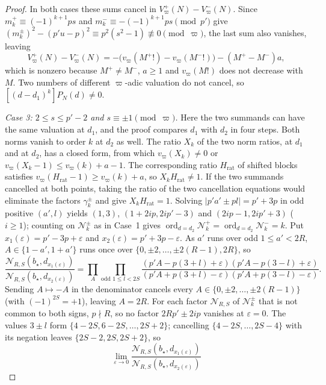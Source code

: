 \documentclass[twoside,10pt]{article}
\numberwithin{equation}{section}
\theoremstyle{slbody}
\theoremstyle{definition}
\theoremstyle{remark}
\newcommand{\ord}{\operatorname{ord}}
\begin{document}
\begin{proof}
In both cases these sums cancel in \(V_\varpi^+(N)-V_\varpi^-(N)\).  Since
\(m^+_k\equiv(-1)^{k+1}ps\) and \(m^-_k\equiv-(-1)^{k+1}ps\pmod{p'}\) give
\((m^\pm_k)^2-(p'u-p)^2\equiv p^2(s^2-1)\not\equiv0\pmod\varpi\), the last sum
also vanishes, leaving
\[
 V_\varpi^+(N)-V_\varpi^-(N)=-\bigl(v_\varpi(M^+!)-v_\varpi(M^-!)\bigr)-(M^+-M^-)a,
\]
which is nonzero because \(M^+\neq M^-\), \(a\geq1\) and \(v_\varpi(M!)\) does not
decrease with \(M\).  Two numbers of different \(\varpi\)-adic valuation do not
cancel, so \([(d-d_1)^k]P_N(d)\neq0\).

\emph{Case 3: \(2\leq s\leq p'-2\) and \(s\equiv\pm1\pmod\varpi\).}  Here the
two summands can have the same valuation at \(d_1\), and the proof compares
\(d_1\) with \(d_2\) in four steps.  Both norms vanish to order \(k\) at
\(d_2\) as well.  The ratio \(X_k\) of the two norm ratios, at \(d_1\) and at
\(d_2\), has a closed form, from which \(v_\varpi(X_k)\neq0\) or
\(v_\varpi(X_k-1)\leq v_\varpi(k)+a-1\).  The corresponding ratio
\(H_{\mathrm{rat}}\) of shifted blocks satisfies
\(v_\varpi(H_{\mathrm{rat}}-1)\geq v_\varpi(k)+a\), so
\(X_kH_{\mathrm{rat}}\neq1\).  If the two summands cancelled at both points,
taking the ratio of the two cancellation equations would eliminate the
factors \(\gamma^\pm_k\) and give \(X_kH_{\mathrm{rat}}=1\).
Solving
\(|p'a'\pm pl|=p'+3p\) in odd positive \((a',l)\) yields \((1,3)\),
\((1+2ip,2ip'-3)\) and \((2ip-1,2ip'+3)\) (\(i\geq1\)); counting on
\(\mathcal N^\pm_k\) as in Case~1 gives
\(\ord_{d=d_2}\mathcal N^+_k=\ord_{d=d_2}\mathcal N^-_k=k\).  Put
\(x_1(\varepsilon)=p'-3p+\varepsilon\) and
\(x_2(\varepsilon)=p'+3p-\varepsilon\).  As \(a'\) runs over odd
\(1\leq a'<2R\), \(A\in\{1-a',1+a'\}\) runs once over
\(\{0,\pm2,\ldots,\pm2(R-1),2R\}\), so
\[
 \frac{{\mathcal N}_{R,S}(b_\star,d_{x_1(\varepsilon)})}
      {{\mathcal N}_{R,S}(b_\star,d_{x_2(\varepsilon)})}
 =\prod_{A}\prod_{\text{odd }1\leq l<2S}
 \frac{(p'A-p(3+l)+\varepsilon)(p'A-p(3-l)+\varepsilon)}
      {(p'A+p(3+l)-\varepsilon)(p'A+p(3-l)-\varepsilon)}.
\]
Sending \(A\mapsto-A\) in the denominator cancels every
\(A\in\{0,\pm2,\ldots,\pm2(R-1)\}\) (with \((-1)^{2S}=+1\)), leaving
\(A=2R\).  For each factor \({\mathcal N}_{R,S}\) of \(\mathcal N^\pm_k\) that is not
common to both signs, \(p\nmid R\), so no factor \(2Rp'\pm2ip\) vanishes at
\(\varepsilon=0\).  The values \(3\pm l\) form \(\{4-2S,6-2S,\dots,2S+2\}\);
cancelling \(\{4-2S,\dots,2S-4\}\) with its negation leaves
\(\{2S-2,2S,2S+2\}\), so
\[
 \lim_{\varepsilon\to0}
 \frac{{\mathcal N}_{R,S}(b_\star,d_{x_1(\varepsilon)})}
      {{\mathcal N}_{R,S}(b_\star,d_{x_2(\varepsilon)})}
\]
\end{proof}
\end{document}
